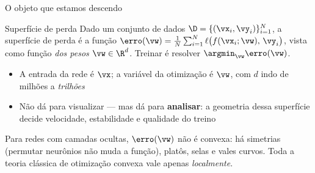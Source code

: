\documentclass[aspectratio=169, 11pt]{beamer}
\begin{document}
\begin{frame}{O objeto que estamos descendo}
  \begin{defbox}{Superfície de perda}
    Dado um conjunto de dados \(\D = \{(\vx_i, \vy_i)\}_{i=1}^{N}\), a superfície
    de perda é a função
    \(\erro(\vw) = \frac{1}{N}\sum_{i=1}^{N} \ell\bigl(f(\vx_i; \vw),\, \vy_i\bigr)\),
    vista como função \emph{dos pesos} \(\vw \in \R^d\). Treinar é resolver
    \(\argmin_{\vw} \erro(\vw)\).
  \end{defbox}

  \begin{itemize}\setlength{\itemsep}{0.2ex}
    \item A entrada da rede é \(\vx\); a variável da otimização é \(\vw\),
          com \(d\) indo de milhões a \emph{trilhões}
    \item Não dá para visualizar — mas dá para \textbf{analisar}: a geometria
          dessa superfície decide velocidade, estabilidade e qualidade do treino
  \end{itemize}

  \begin{alertabox}
    Para redes com camadas ocultas, \(\erro(\vw)\) \alert{não é convexa}: há
    simetrias (permutar neurônios não muda a função), platôs, selas e vales
    curvos. Toda a teoria clássica de otimização convexa vale apenas
    \emph{localmente}.
  \end{alertabox}
\end{frame}
\end{document}
